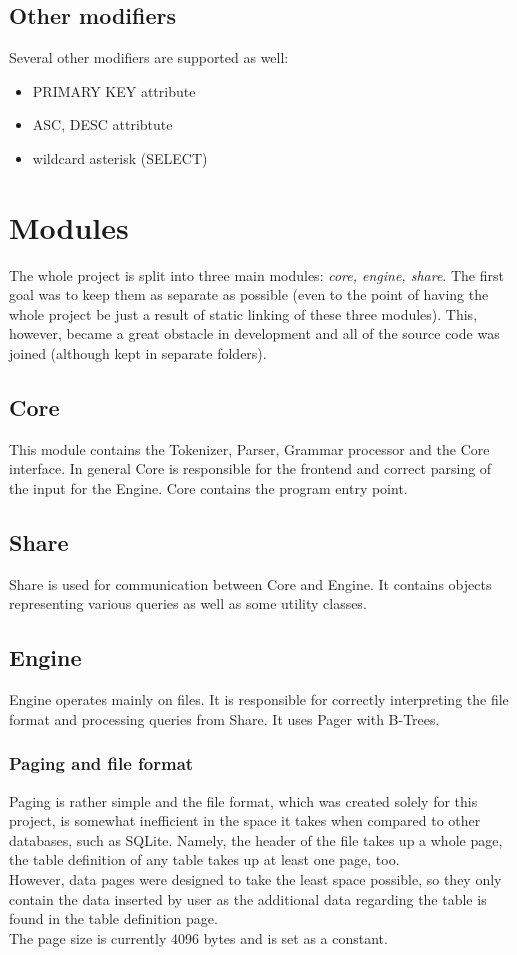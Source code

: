 \documentclass[a4paper]{article}
\begin{document}
\subsection{Other modifiers}
Several other modifiers are supported as well:
\begin{itemize}
    \item PRIMARY KEY attribute
    \item ASC, DESC attribtute
    \item wildcard asterisk (SELECT)
\end{itemize}

\section{Modules}
The whole project is split into three main modules: \textit{core, engine, share}. The first goal was to keep them as separate as possible (even to the point of having the whole project be just a result of static linking of these three modules). This, however, became a great obstacle in development and all of the source code was joined (although kept in separate folders).

\subsection{Core}
This module contains the Tokenizer, Parser, Grammar processor and the Core interface. In general Core is responsible for the frontend and correct parsing of the input for the Engine. Core contains the program entry point.

\subsection{Share}
Share is used for communication between Core and Engine. It contains objects representing various queries as well as some utility classes.

\subsection{Engine}
Engine operates mainly on files. It is responsible for correctly interpreting the file format and processing queries from Share. It uses Pager with B-Trees.

\subsubsection{Paging and file format}
Paging is rather simple and the file format, which was created solely for this project, is somewhat inefficient in the space it takes when compared to other databases, such as SQLite. Namely, the header of the file takes up a whole page, the table definition of any table takes up at least one page, too.\\
However, data pages were designed to take the least space possible, so they only contain the data inserted by user as the additional data regarding the table is found in the table definition page.\\
The page size is currently 4096 bytes and is set as a constant.
\end{document}

